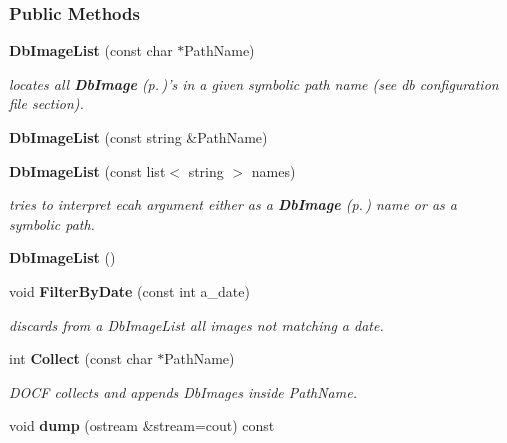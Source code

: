\subsubsection*{Public Methods}
\begin{CompactItemize}
\item 
{\bf Db\-Image\-List} (const char $\ast$Path\-Name)
\begin{CompactList}\small\item\em locates all {\bf Db\-Image} {\rm (p.\,\pageref{class_dbimage})}'s in a given symbolic path name (see db configuration file section).\item\end{CompactList}\item 
{}
{\bf Db\-Image\-List} (const string \&Path\-Name)\label{class_dbimagelist_a1}

\item 
{}
{\bf Db\-Image\-List} (const list$<$ string $>$ names)\label{class_dbimagelist_a2}

\begin{CompactList}\small\item\em tries to interpret ecah argument either as a {\bf Db\-Image} {\rm (p.\,\pageref{class_dbimage})} name or as a symbolic path.\item\end{CompactList}\item 
{}
{\bf Db\-Image\-List} ()\label{class_dbimagelist_a3}

\item 
{}
void {\bf Filter\-By\-Date} (const int a\_\-date)\label{class_dbimagelist_a4}

\begin{CompactList}\small\item\em discards from a Db\-Image\-List all images not matching a date.\item\end{CompactList}\item 
{}
int {\bf Collect} (const char $\ast$Path\-Name)\label{class_dbimagelist_a5}

\begin{CompactList}\small\item\em DOCF collects and appends Db\-Images inside Path\-Name.\item\end{CompactList}\item 
{}
void {\bf dump} (ostream \&stream=cout) const\label{class_dbimagelist_a6}

\end{CompactItemize}
